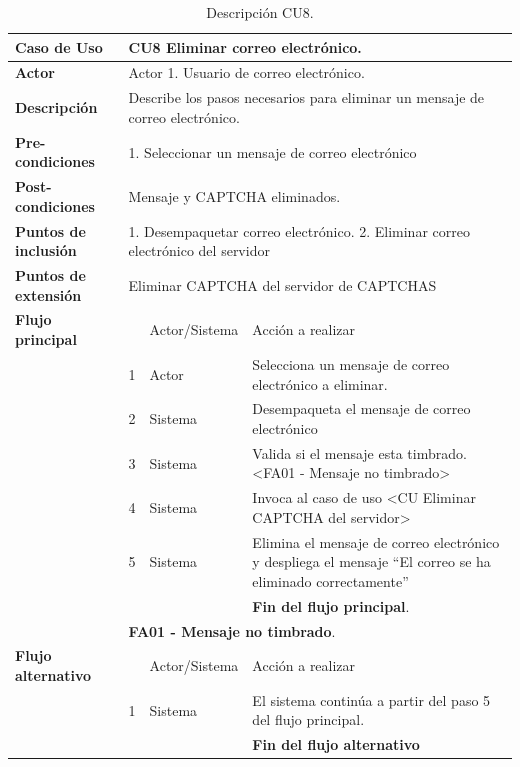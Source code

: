 \documentclass[12pt,oneside,onecolumn,openany]{report}
\begin{document}
\begin{table}[H]
 \centering
   {
     \begin{tabular}{| p{} | p{} |p{4cm}|p{5cm}|}
     \hline
     \textbf{Caso de Uso} &\multicolumn{3}{|l|}{CU8 Eliminar correo electrónico.}\\
     \hline
     \textbf{Actor} & \multicolumn{3}{|l|}{Actor 1. Usuario de correo electrónico.}\\
     \hline
     \textbf{Descripción} & \multicolumn{3}{|p{10cm}|}{Describe los pasos necesarios para eliminar un mensaje de correo electrónico.}\\
     \hline
     \textbf{Pre-condiciones} & \multicolumn{3}{|l|}{1. Seleccionar un mensaje de correo electrónico}\\
     \hline
     \textbf{Post-condiciones} & \multicolumn{3}{|l|}{Mensaje y CAPTCHA eliminados.}\\
     \hline
     \textbf{Puntos de inclusión} & \multicolumn{3}{|p{10cm}|}{1. Desempaquetar correo electrónico. 2. Eliminar correo electrónico del servidor}\\
     \hline
     \textbf{Puntos de extensión} & \multicolumn{3}{|l|}{Eliminar CAPTCHA del servidor de CAPTCHAS}\\
     \hline
     \textbf{Flujo principal} & & Actor/Sistema & Acción a realizar\\
     \hline
     & 1 & Actor & Selecciona un mensaje de correo electrónico a eliminar.\\
     \hline
     & 2 & Sistema & Desempaqueta el mensaje de correo electrónico\\
     \hline
     & 3 & Sistema & Valida si el mensaje esta timbrado. <FA01 - Mensaje no timbrado>\\
     \hline
     & 4 & Sistema & Invoca al caso de uso <CU Eliminar CAPTCHA del servidor>\\
     \hline
     & 5 & Sistema & Elimina el mensaje de correo electrónico y despliega el mensaje ``El correo se ha eliminado correctamente''\\
     \hline
     & & & \textbf{Fin del flujo principal}.\\
     \hline
     & \multicolumn{3}{|l|}{\textbf{FA01 - Mensaje no timbrado}.}\\
     \hline
     \textbf{Flujo alternativo} & & Actor/Sistema & Acción a realizar\\
     \hline
     & 1 & Sistema & El sistema continúa a partir del paso 5 del flujo principal.\\
     \hline
     &  & & \textbf{Fin del flujo alternativo}\\
     
     \end{tabular}
    }
    \caption{Descripción CU8.}
    \label{tabla:CU8}
\end{table}
\end{document}
